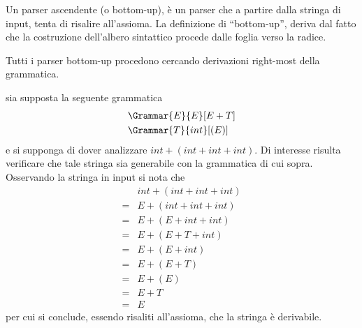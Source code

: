 \documentclass{subfiles}
\begin{document}
Un parser ascendente (o bottom-up), è un parser che a partire dalla stringa di input, tenta di risalire all'assioma.
La definizione di ``bottom-up'', deriva dal fatto che la costruzione dell'albero sintattico procede dalle foglia verso la radice.

\begin{Remark*}
    Tutti i parser bottom-up procedono cercando  derivazioni right-most della grammatica.

    \begin{Example*}
        sia supposta la seguente grammatica
        \[\begin{aligned}
                 & \Grammar{E}{E}[E + T] \\
                 & \Grammar{T}{int}[(E)]
            \end{aligned}\]
        e si supponga di dover analizzare \(int  + (int + int + int)\).
        Di interesse risulta verificare che tale stringa sia generabile con la grammatica di cui sopra.
        Osservando la stringa in input si nota che
        \[\begin{aligned}
                  & int + (int + int + int) \\
                = & E + (int + int + int)   \\
                = & E + (E + int + int)     \\
                = & E + (E + T + int)       \\
                = & E + (E + int)           \\
                = & E + (E + T)             \\
                = & E + (E)                 \\
                = & E + T                   \\
                = & E
            \end{aligned}\]
        per cui si conclude, essendo risaliti all'assioma, che la stringa è derivabile.
    \end{Example*}
\end{Remark*}
\end{document}
